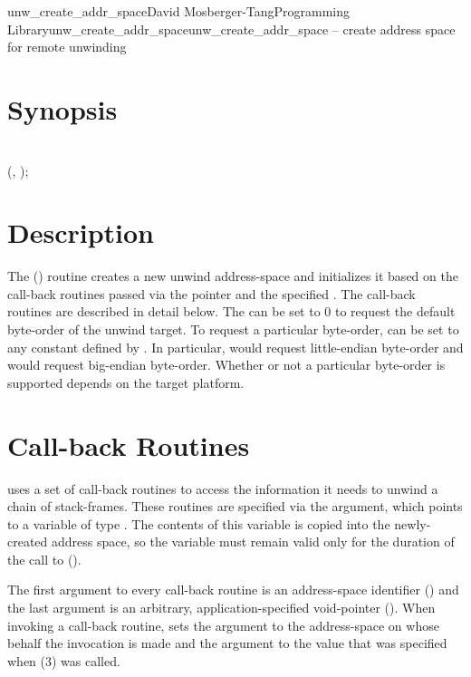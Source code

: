 \documentclass{article}
\begin{document}
\begin{Name}{3}{unw\_create\_addr\_space}{David Mosberger-Tang}{Programming Library}{unw\_create\_addr\_space}unw\_create\_addr\_space -- create address space for remote unwinding
\end{Name}

\section{Synopsis}

\\

 (,  );\\

\section{Description}

The () routine creates a new unwind
address-space and initializes it based on the call-back routines
passed via the  pointer and the specified .
The call-back routines are described in detail below.  The
 can be set to 0 to request the default byte-order of
the unwind target.  To request a particular byte-order,
 can be set to any constant defined by
.  In particular,  would
request little-endian byte-order and  would
request big-endian byte-order.  Whether or not a particular byte-order
is supported depends on the target platform.

\section{Call-back Routines}

 uses a set of call-back routines to access the
information it needs to unwind a chain of stack-frames.  These
routines are specified via the  argument, which points to a
variable of type .  The contents of this
variable is copied into the newly-created address space, so the
variable must remain valid only for the duration of the call to
().

The first argument to every call-back routine is an address-space
identifier () and the last argument is an arbitrary,
application-specified void-pointer ().  When invoking a
call-back routine,  sets the  argument to the
address-space on whose behalf the invocation is made and the 
argument to the value that was specified when
(3) was called.
\end{document}
